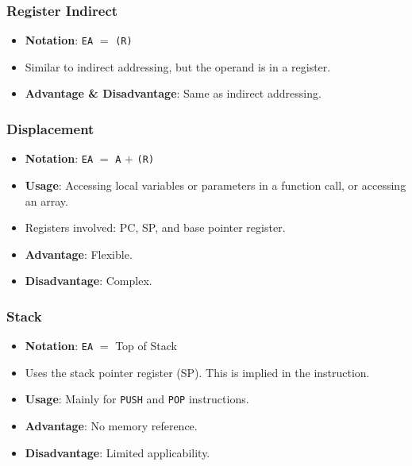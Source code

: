 \begin{multicols}{3}
\columnbreak

\subsubsection{Register Indirect}

\begin{itemize}
    \item \textbf{Notation}: \texttt{EA} $=$ \texttt{(R)}
    \item Similar to indirect addressing, but the operand is in a register.
    \item \textbf{Advantage \& Disadvantage}: Same as indirect addressing.
\end{itemize}

\subsubsection{Displacement}

\begin{itemize}
    \item \textbf{Notation}: \texttt{EA} $=$ \texttt{A} $+$ \texttt{(R)}
    \item \textbf{Usage}: Accessing local variables or parameters in a function call,
        or accessing an array.
    \item Registers involved: PC, SP, and base pointer register.
    \item \textbf{Advantage}: Flexible.
    \item \textbf{Disadvantage}: Complex.
\end{itemize}

\end{multicols}

\subsubsection{Stack}

\begin{itemize}
    \item \textbf{Notation}: \texttt{EA} $=$ Top of Stack
    \item Uses the stack pointer register (SP). This is implied in the instruction.
    \item \textbf{Usage}: Mainly for \texttt{PUSH} and \texttt{POP} instructions.
    \item \textbf{Advantage}: No memory reference.
    \item \textbf{Disadvantage}: Limited applicability.
\end{itemize}

